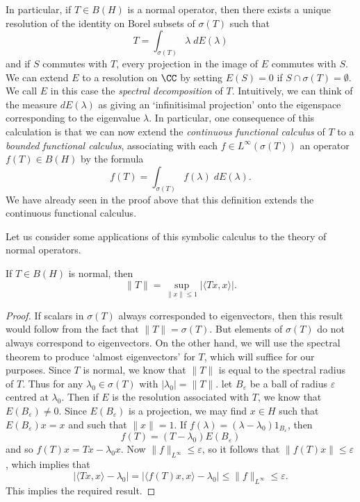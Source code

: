 In particular, if $T \in B(H)$ is a normal operator, then there exists a unique resolution of the identity on Borel subsets of $\sigma(T)$ such that
%
\[ T = \int_{\sigma(T)} \lambda\; dE(\lambda) \]
%
and if $S$ commutes with $T$, every projection in the image of $E$ commutes with $S$. We can extend $E$ to a resolution on $\CC$ by setting $E(S) = 0$ if $S \cap \sigma(T) = \emptyset$. We call $E$ in this case the \emph{spectral decomposition} of $T$. Intuitively, we can think of the measure $dE(\lambda)$ as giving an `infinitisimal projection' onto the eigenspace corresponding to the eigenvalue $\lambda$. In particular, one consequence of this calculation is that we can now extend the \emph{continuous functional calculus} of $T$ to a \emph{bounded functional calculus}, associating with each $f \in L^\infty(\sigma(T))$ an operator $f(T) \in B(H)$ by the formula
%
\[ f(T) = \int_{\sigma(T)} f(\lambda)\; dE(\lambda). \]
%
We have already seen in the proof above that this definition extends the continuous functional calculus.

Let us consider some applications of this symbolic calculus to the theory of normal operators.

\begin{theorem}
    If $T \in B(H)$ is normal, then
    \[ \| T \| = \sup_{\|x\| \leq 1} \big| \langle Tx, x \rangle \big|. \]
\end{theorem}
\begin{proof}
    If scalars in $\sigma(T)$ always corresponded to eigenvectors, then this result would follow from the fact that $\| T \| = \sigma(T)$. But elements of $\sigma(T)$ do not always correspond to eigenvectors. On the other hand, we will use the spectral theorem to produce `almost eigenvectors' for $T$, which will suffice for our purposes. Since $T$ is normal, we know that $\| T \|$ is equal to the spectral radius of $T$. Thus for any $\lambda_0 \in \sigma(T)$ with $|\lambda_0| = \| T \|$. let $B_\varepsilon$ be a ball of radius $\varepsilon$ centred at $\lambda_0$. Then if $E$ is the resolution associated with $T$, we know that $E(B_\varepsilon) \neq 0$. Since $E(B_\varepsilon)$ is a projection, we may find $x \in H$ such that $E(B_\varepsilon) x = x$ and such that $\| x \| = 1$. If $f(\lambda) = (\lambda - \lambda_0) 1_{B_\varepsilon}$, then
    \[ f(T) = (T - \lambda_0) E(B_\varepsilon) \]
    and so $f(T) x = Tx - \lambda_0 x$. Now $\| f \|_{L^\infty} \leq \varepsilon$, so it follows that $\| f(T) x \| \leq \varepsilon$, which implies that
    \[ |\langle Tx, x \rangle - \lambda_0| = |\langle f(T)x, x \rangle - \lambda_0| \leq \| f \|_{L^\infty} \leq \varepsilon. \]
    This implies the required result.
\end{proof}

